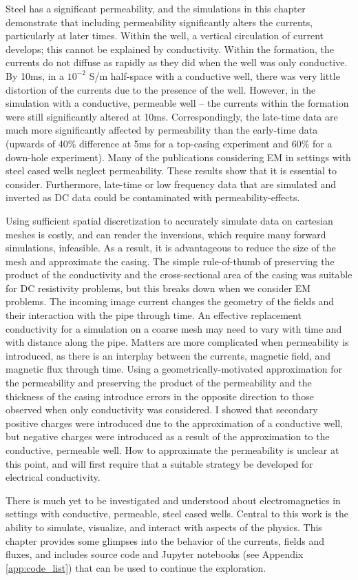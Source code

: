 Steel has a significant permeability, and the simulations in this chapter demonstrate that including permeability significantly alters the currents, particularly at later times. Within the well, a vertical circulation of current develops; this cannot be explained by conductivity. Within the formation, the currents do not diffuse as rapidly as they did when the well was only conductive. By 10ms, in a $10^{-2}$ S/m half-space with a conductive well, there was very little distortion of the currents due to the presence of the well. However, in the simulation with a conductive, permeable well -- the currents within the formation were still significantly altered at 10ms. Correspondingly, the late-time data are much more significantly affected by permeability than the early-time data (upwards of 40\% difference at 5ms for a top-casing experiment and 60\% for a down-hole experiment). Many of the publications considering EM in settings with steel cased wells neglect permeability. These results show that it is essential to consider. Furthermore, late-time or low frequency data that are simulated and inverted as DC data could be contaminated with permeability-effects.

Using sufficient spatial discretization to accurately simulate data on cartesian meshes is costly, and can render the inversions, which require many forward simulations, infeasible. As a result, it is advantageous to reduce the size of the mesh and approximate the casing.
The simple rule-of-thumb of preserving the product of the conductivity and the cross-sectional area of the casing was suitable for DC resistivity problems, but this breaks down when we consider EM problems. The incoming image current changes the geometry of the fields and their interaction with the pipe through time. An effective replacement conductivity for a simulation on a coarse mesh may need to vary with time and with distance along the pipe. Matters are more complicated when permeability is introduced, as there is an interplay between the currents, magnetic field, and magnetic flux through time. Using a geometrically-motivated approximation for the permeability and preserving the product of the permeability and the thickness of the casing introduce errors in the opposite direction to those observed when only conductivity was considered. I showed that secondary positive charges were introduced due to the approximation of a conductive well, but negative charges were introduced as a result of the approximation to the conductive, permeable well. How to approximate the permeability is unclear at this point, and will first require that a suitable strategy be developed for electrical conductivity.

There is much yet to be investigated and understood about electromagnetics in settings with conductive, permeable, steel cased wells. Central to this work is the ability to simulate, visualize, and interact with aspects of the physics. This chapter provides some glimpses into the behavior of the currents, fields and fluxes, and includes source code and Jupyter notebooks (see Appendix \ref{app:code_list}) that can be used to continue the exploration.

